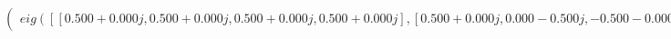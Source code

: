 \documentclass[border=1em]{standalone}
\begin{document}
$
\left(
\begin{array}{cccc}
e
i
g
(
[
[
0
.
5
0
0
+
0
.
0
0
0
j
,
 
0
.
5
0
0
+
0
.
0
0
0
j
,
 
0
.
5
0
0
+
0
.
0
0
0
j
,
 
0
.
5
0
0
+
0
.
0
0
0
j
]
,
[
0
.
5
0
0
+
0
.
0
0
0
j
,
 
0
.
0
0
0
-
0
.
5
0
0
j
,
 
-
0
.
5
0
0
-
0
.
0
0
0
j
,
 
-
0
.
0
0
0
+
0
.
5
0
0
j
]
,
[
0
.
5
0
0
+
0
.
0
0
0
j
,
 
-
0
.
5
0
0
-
0
.
0
0
0
j
,
 
0
.
5
0
0
+
0
.
0
0
0
j
,
 
-
0
.
5
0
0
-
0
.
0
0
0
j
]
,
[
0
.
5
0
0
+
0
.
0
0
0
j
,
 
-
0
.
0
0
0
+
0
.
5
0
0
j
,
 
-
0
.
5
0
0
-
0
.
0
0
0
j
,
 
0
.
0
0
0
-
0
.
5
0
0
j
]
]
)
\end{array}
\right)
$
\end{document}
